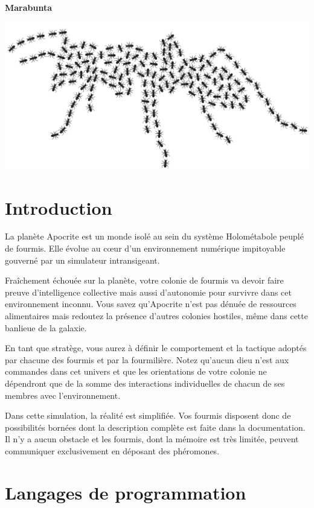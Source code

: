 \documentclass[a4paper, 11pt]{article}
\begin{document}
	\begin{center}
		\LARGE\bfseries
		Marabunta

		\includegraphics[width=15cm]{../documentation/_static/images/logo_marabunta.png}
	\end{center}


	\section{Introduction}

La planète Apocrite est un monde isolé au sein du système Holométabole peuplé de
fourmis. Elle évolue au cœur d’un environnement numérique impitoyable gouverné
par un simulateur intransigeant.

Fraîchement échouée sur la planète, votre colonie de fourmis va devoir faire
preuve d’intelligence collective mais aussi d’autonomie pour survivre dans cet
environnement inconnu. Vous savez qu’Apocrite n’est pas dénuée de ressources
alimentaires mais redoutez la présence d’autres colonies hostiles, même dans
cette banlieue de la galaxie.

En tant que stratège, vous aurez à définir le comportement et la tactique
adoptés par chacune des fourmis et par la fourmilière. Notez qu’aucun dieu n’est
aux commandes dans cet univers et que les orientations de votre colonie ne
dépendront que de la somme des interactions individuelles de chacun de ses
membres avec l’environnement.

Dans cette simulation, la réalité est simplifiée. Vos fourmis disposent donc de
possibilités bornées dont la description complète est faite dans la
documentation. Il n’y a aucun obstacle et les fourmis, dont la mémoire est très
limitée, peuvent communiquer exclusivement en déposant des phéromones.

	\section{Langages de programmation}
\end{document}
